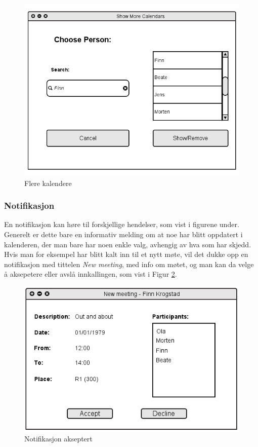 \begin{figure}[H]
\centering
\includegraphics[scale=0.5]{images/flerekalendere.png}
\caption{Flere kalendere}
\label{flerekalendere_image}
\end{figure}

\subsubsection{Notifikasjon}
En notifikasjon kan høre til forskjellige hendelser, som vist i figurene under. Generelt er dette bare en informativ melding om at noe har blitt oppdatert i kalenderen, der man bare har noen enkle valg, avhengig av hva som har skjedd. Hvis man for eksempel har blitt kalt inn til et nytt møte, vil det dukke opp en notifikasjon med tittelen \emph{New meeting}, med info om møtet, og man kan da velge å aksepetere eller avslå innkallingen, som vist i Figur \ref{notifikasjon_akseptert_image}.

\begin{figure}[H]
\centering
\includegraphics[scale=0.65]{images/notifikasjon_akseptert.png}
\caption{Notifikasjon akseptert}
\label{notifikasjon_akseptert_image}
\end{figure}

